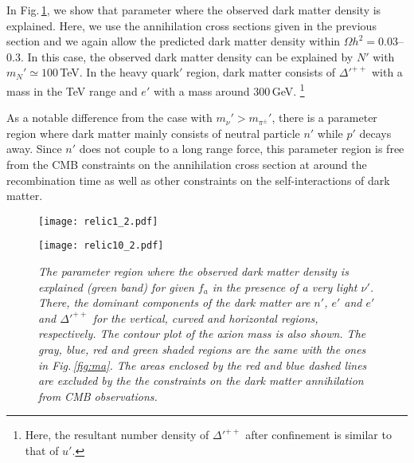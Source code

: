 \documentclass[aps,amsmath,preprint,epsf,superscriptaddress,nofootinbib,notitlepage]{revtex4-1}
\begin{document}
In Fig.\,\ref{fig:relic2}, we show that parameter where the observed dark matter density is explained.
Here, we use the annihilation cross sections given in the previous section
and we again allow the predicted dark matter density within $\Omega h^2 = 0.03$--$0.3$.
In this case, the observed dark matter density can be explained by $N'$ with $m_{N}' \simeq 100$\,TeV.
In the heavy quark$'$ region,  dark matter consists of $\Delta'^{++}$ with a mass in the TeV range 
and $e'$ with a mass around $300$\,GeV.%
\footnote{Here, the resultant number density of $\Delta'^{++}$ after confinement is similar to that of $u'$.}

As a notable difference from the case with  $m_{\nu}' > m_{\pi^\pm}'$, there is a parameter region
where dark matter mainly consists of neutral particle $n'$ while $p'$ decays away.
Since $n'$ does not couple to a long range force, this parameter region is free from
the CMB constraints on the annihilation cross section at around the recombination time
as well as other constraints on the self-interactions of dark matter.





\begin{figure}[t]
\begin{center}
 \begin{minipage}{.46\linewidth}
  \texttt{[image: relic1\_2.pdf]}
 \end{minipage}
 \hspace{1cm}
 \begin{minipage}{.46\linewidth}
  \texttt{[image: relic10\_2.pdf]}
 \end{minipage}

 \end{center}
\caption{\sl \small
The parameter region where the observed dark matter density is explained (green band)
for given  $f_a$ in the presence of a very light $\nu'$. There, the dominant components of the dark matter are $n'$, $e'$ and $e'$ and $\Delta'^{++}$ for the vertical, curved and horizontal regions, respectively.
The contour plot of the axion mass is also shown.
The gray, blue, red and green shaded regions are the same with the ones in Fig.\,\ref{fig:ma}.
The areas enclosed by the red and blue dashed lines are excluded by the 
the constraints on the dark matter annihilation from CMB observations.
}
\label{fig:relic2}
\end{figure}
\end{document}
